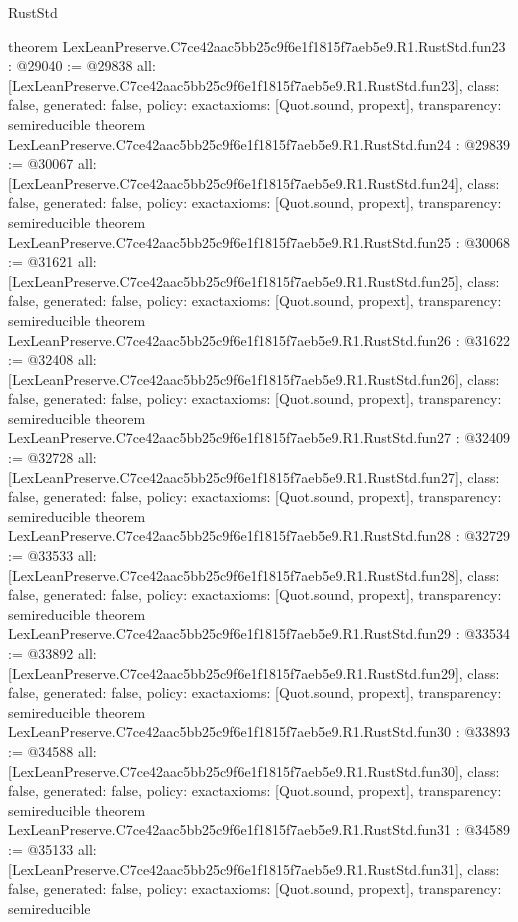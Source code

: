 \begin{lexlean}{RustStd}
\begin{coremodule}
{}
theorem LexLeanPreserve.C7ce42aac5bb25c9f6e1f1815f7aeb5e9.R1.RustStd.fun23 : @29040 := @29838 {
  all: [LexLeanPreserve.C7ce42aac5bb25c9f6e1f1815f7aeb5e9.R1.RustStd.fun23],
  class: false,
  generated: false,
  policy: exact{axioms: [Quot.sound, propext]},
  transparency: semireducible
}
theorem LexLeanPreserve.C7ce42aac5bb25c9f6e1f1815f7aeb5e9.R1.RustStd.fun24 : @29839 := @30067 {
  all: [LexLeanPreserve.C7ce42aac5bb25c9f6e1f1815f7aeb5e9.R1.RustStd.fun24],
  class: false,
  generated: false,
  policy: exact{axioms: [Quot.sound, propext]},
  transparency: semireducible
}
theorem LexLeanPreserve.C7ce42aac5bb25c9f6e1f1815f7aeb5e9.R1.RustStd.fun25 : @30068 := @31621 {
  all: [LexLeanPreserve.C7ce42aac5bb25c9f6e1f1815f7aeb5e9.R1.RustStd.fun25],
  class: false,
  generated: false,
  policy: exact{axioms: [Quot.sound, propext]},
  transparency: semireducible
}
theorem LexLeanPreserve.C7ce42aac5bb25c9f6e1f1815f7aeb5e9.R1.RustStd.fun26 : @31622 := @32408 {
  all: [LexLeanPreserve.C7ce42aac5bb25c9f6e1f1815f7aeb5e9.R1.RustStd.fun26],
  class: false,
  generated: false,
  policy: exact{axioms: [Quot.sound, propext]},
  transparency: semireducible
}
theorem LexLeanPreserve.C7ce42aac5bb25c9f6e1f1815f7aeb5e9.R1.RustStd.fun27 : @32409 := @32728 {
  all: [LexLeanPreserve.C7ce42aac5bb25c9f6e1f1815f7aeb5e9.R1.RustStd.fun27],
  class: false,
  generated: false,
  policy: exact{axioms: [Quot.sound, propext]},
  transparency: semireducible
}
theorem LexLeanPreserve.C7ce42aac5bb25c9f6e1f1815f7aeb5e9.R1.RustStd.fun28 : @32729 := @33533 {
  all: [LexLeanPreserve.C7ce42aac5bb25c9f6e1f1815f7aeb5e9.R1.RustStd.fun28],
  class: false,
  generated: false,
  policy: exact{axioms: [Quot.sound, propext]},
  transparency: semireducible
}
theorem LexLeanPreserve.C7ce42aac5bb25c9f6e1f1815f7aeb5e9.R1.RustStd.fun29 : @33534 := @33892 {
  all: [LexLeanPreserve.C7ce42aac5bb25c9f6e1f1815f7aeb5e9.R1.RustStd.fun29],
  class: false,
  generated: false,
  policy: exact{axioms: [Quot.sound, propext]},
  transparency: semireducible
}
theorem LexLeanPreserve.C7ce42aac5bb25c9f6e1f1815f7aeb5e9.R1.RustStd.fun30 : @33893 := @34588 {
  all: [LexLeanPreserve.C7ce42aac5bb25c9f6e1f1815f7aeb5e9.R1.RustStd.fun30],
  class: false,
  generated: false,
  policy: exact{axioms: [Quot.sound, propext]},
  transparency: semireducible
}
theorem LexLeanPreserve.C7ce42aac5bb25c9f6e1f1815f7aeb5e9.R1.RustStd.fun31 : @34589 := @35133 {
  all: [LexLeanPreserve.C7ce42aac5bb25c9f6e1f1815f7aeb5e9.R1.RustStd.fun31],
  class: false,
  generated: false,
  policy: exact{axioms: [Quot.sound, propext]},
  transparency: semireducible
}
\end{coremodule}
\end{lexlean}

